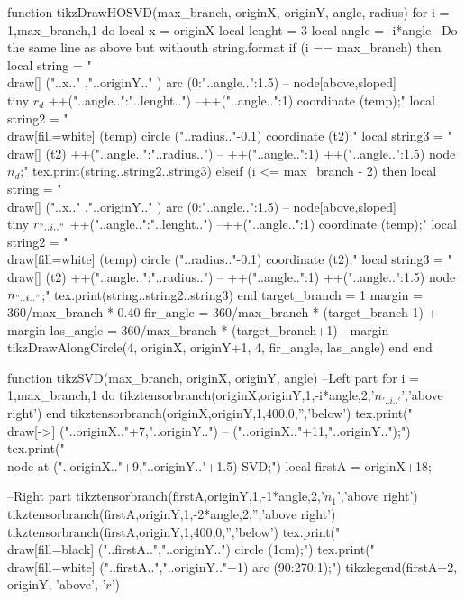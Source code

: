 \begin{luacode*}
function tikzDrawHOSVD(max_branch, originX, originY, angle, radius)
      for i = 1,max_branch,1 do
      local x = originX
      local lenght = 3
      local angle = -i*angle
      --Do the same line as above but withouth string.format
      if (i == max_branch) then
      local string = "\\draw[] ("..x.." ,"..originY.." ) arc (0:"..angle..":1.5) -- node[above,sloped] {\\tiny $r_{d}$} ++("..angle..":"..lenght..") --++("..angle..":1) coordinate (temp);"
      local string2 = "\\draw[fill=white] (temp) circle ("..radius.."-0.1) coordinate (t2);"
      local string3 = "\\draw[] (t2) ++("..angle..":"..radius..") -- ++("..angle..":1) ++("..angle..":1.5) node {$n_{d}$};"
      tex.print(string..string2..string3)
      elseif (i <= max_branch - 2) then
      local string = "\\draw[] ("..x.." ,"..originY.." ) arc (0:"..angle..":1.5) -- node[above,sloped] {\\tiny $r_{"..i.."}$} ++("..angle..":"..lenght..")  --++("..angle..":1) coordinate (temp);"
      local string2 = "\\draw[fill=white] (temp) circle ("..radius.."-0.1) coordinate (t2);"
      local string3 = "\\draw[] (t2) ++("..angle..":"..radius..") -- ++("..angle..":1) ++("..angle..":1.5) node {$n_{"..i.."}$};"
      tex.print(string..string2..string3)
      end
      target_branch = 1
      margin = 360/max_branch * 0.40
      fir_angle = 360/max_branch * (target_branch-1) + margin
      las_angle = 360/max_branch * (target_branch+1) - margin
      tikzDrawAlongCircle(4, originX, originY+1, 4, fir_angle, las_angle)
      end
    end

    function tikzSVD(max_branch, originX, originY, angle)
    --Left part
          for i = 1,max_branch,1 do
          tikztensorbranch(originX,originY,1,-i*angle,2,'$n_{'..i..'}$','above right')
          end
          tikztensorbranch(originX,originY,1,400,0,'','below')
          tex.print("\\draw[->] ("..originX.."+7,"..originY..") -- ("..originX.."+11,"..originY..");")
          tex.print("\\node at ("..originX.."+9,"..originY.."+1.5) {SVD};")
          local firstA = originX+18;
    
          --Right part
          tikztensorbranch(firstA,originY,1,-1*angle,2,'$n_{1}$','above right')
          tikztensorbranch(firstA,originY,1,-2*angle,2,'','above right')
          tikztensorbranch(firstA,originY,1,400,0,'','below')
          tex.print("\\draw[fill=black] ("..firstA..","..originY..") circle (1cm);")
          tex.print("\\draw[fill=white] ("..firstA..","..originY.."+1) arc (90:270:1);")
          tikzlegend(firstA+2, originY, 'above', '$r$')


\end{luacode*}
